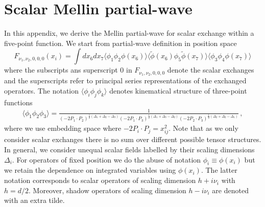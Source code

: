 \section{Scalar Mellin partial-wave}\label{app:ScaMellinpar}
In this appendix, we derive the Mellin partial-wave for scalar exchange within a five-point function. We start from partial-wave definition in position space
\begin{equation}
 	F_{\nu_1, \nu_2,0,0,0}(x_i)=\int dx_6 dx_7 \langle\phi_{1}\phi_2 \phi(x_6)\rangle\langle\tilde{\phi}(x_6)\phi_5 \tilde{\phi}(x_7)\rangle\langle\phi_{3}\phi_4 \phi(x_7)\rangle
\end{equation}
where the subscripts ans superscript $0$ in $F_{\nu_1, \nu_2,0,0,0}$ denote the scalar exchanges and the superscripts refer to principal series representations of the exchanged operators. The notation $\langle \phi_i \phi_j \phi_k\rangle$ denotes kinematical structure of three-point functions
\begin{align}
  \langle\phi_1 \phi_2 \phi_3\rangle=\frac{1}{\left(-2P_{1}\cdot P_{2}\right)^{\frac{1}{2}(\Delta_1+\Delta_2-\Delta_3)}\left(-2P_{1}\cdot P_{3}\right)^{\frac{1}{2}(\Delta_1+\Delta_3-\Delta_2)}\left(-2P_{2}\cdot P_{3}\right)^{\frac{1}{2}(\Delta_2+\Delta_2-\Delta_1)}}\,,
\end{align}
where we use embedding space where $-2 P_{i}\cdot P_{j}=x_{ij}^2$.
Note that as we only consider scalar exchanges there is no sum over different possible tensor structures. In general, we consider unequal scalar fields labelled by their scaling dimensions $\Delta_i$. For operators of fixed position we do the abuse of notation $\phi_i\equiv\phi(x_i)$ but we retain the dependence on integrated variables using $\phi(x_i)$. The latter notation corresponds to scalar operators of scaling dimension $h+i \nu_i$ with $h=d/2$. Moreover, shadow operators of scaling dimension $h-i \nu_i$ are denoted with an extra tilde.

